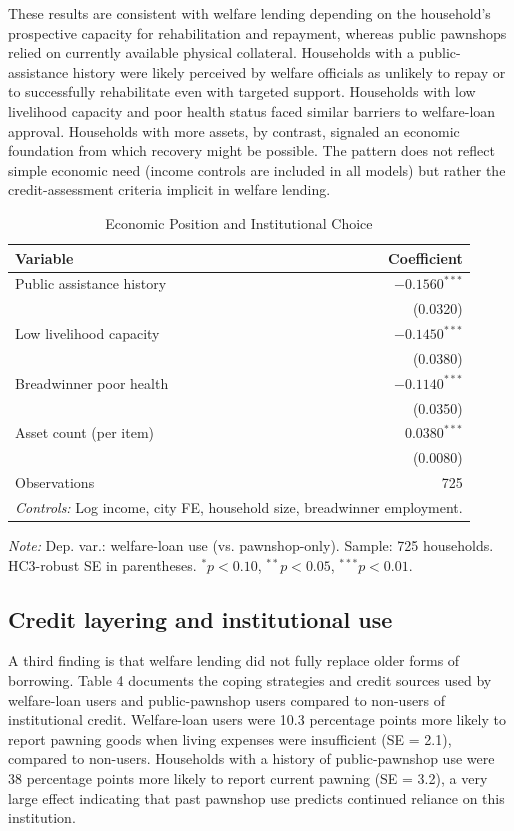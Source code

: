 \documentclass[12pt,a4paper]{article}
\begin{document}
These results are consistent with welfare lending depending on the household's prospective capacity for rehabilitation and repayment, whereas public pawnshops relied on currently available physical collateral. Households with a public-assistance history were likely perceived by welfare officials as unlikely to repay or to successfully rehabilitate even with targeted support. Households with low livelihood capacity and poor health status faced similar barriers to welfare-loan approval. Households with more assets, by contrast, signaled an economic foundation from which recovery might be possible. The pattern does not reflect simple economic need (income controls are included in all models) but rather the credit-assessment criteria implicit in welfare lending.

\begin{table}[!h]
\centering
\small
\caption{Economic Position and Institutional Choice}
\label{tab:position}
\begin{tabular}{lr}
\toprule
Variable & Coefficient \\
\midrule
Public assistance history & $-0.1560^{***}$ \\
 & (0.0320) \\
Low livelihood capacity & $-0.1450^{***}$ \\
 & (0.0380) \\
Breadwinner poor health & $-0.1140^{***}$ \\
 & (0.0350) \\
Asset count (per item) & $0.0380^{***}$ \\
 & (0.0080) \\
\midrule
Observations & 725 \\
\midrule
\multicolumn{2}{p{0.35\textwidth}}{\emph{Controls:} Log income, city FE, household size, breadwinner employment.} \\
\bottomrule
\end{tabular}

\noindent\small\emph{Note:} Dep. var.: welfare-loan use (vs. pawnshop-only). Sample: 725 households. HC3-robust SE in parentheses. $^{*}p<0.10$, $^{**}p<0.05$, $^{***}p<0.01$.
\end{table}

\subsection{Credit layering and institutional use}

A third finding is that welfare lending did not fully replace older forms of borrowing. Table 4 documents the coping strategies and credit sources used by welfare-loan users and public-pawnshop users compared to non-users of institutional credit. Welfare-loan users were 10.3 percentage points more likely to report pawning goods when living expenses were insufficient (SE = 2.1), compared to non-users. Households with a history of public-pawnshop use were 38 percentage points more likely to report current pawning (SE = 3.2), a very large effect indicating that past pawnshop use predicts continued reliance on this institution.
\end{document}
